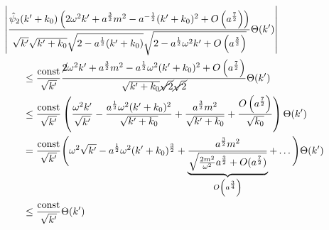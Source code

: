 \begin{align}
&\kern -2em
    \left|
    \frac{
        \hat\psi_2(k'+k_0) \left(
        2 \omega^2 k' + a^{\frac{3}{2}}m^2-a^{-\frac{1}{2}}(k'+k_0)^2
            + O \left(a^{\frac{7}{2}}\right)
        \right)
    }
    {
        \sqrt{k'} \sqrt{k'+k_0} \sqrt{2-a^{\frac{1}{2}}(k'+k_0)}
        \sqrt{2-a^{\frac{1}{2}}\omega^2 k' + O\left(a^{\frac{3}{2}}\right)}
    }
    \Theta(k')
    \right|
    \nonumber \\ &\leq
    \frac{\textrm{const}}{\sqrt{k'}}
    \frac{
        \cancel{2}\omega^2 k' + a^{\frac{3}{2}}m^2
        -a^{\frac{1}{2}} \omega^2 (k'+k_0)^2 + O\left(a^{\frac{7}{2}}\right)
    }
    {
        \sqrt{k' + k_0}\cancel{\sqrt{2}} \cancel{\sqrt{2}}
    }\Theta(k')
    \nonumber \\ &\leq
    \frac{\textrm{const}}{\sqrt{k'}}
    \left(
        \frac{\omega^2 k'}{\sqrt{k'}}
        - \frac{a^{\frac{1}{2}}\omega^2(k'+k_0)^2}{\sqrt{k'+k_0}}
        + \frac{a^{\frac{3}{2}}m^2}{\sqrt{k'+k_0}}
        + \frac{O\left(a^{\frac{7}{2}}\right)}{\sqrt{k_0}}
    \right)\Theta(k')
    \nonumber \\ &=
    \frac{\textrm{const}}{\sqrt{k'}}
    \Bigg(
        \omega^2 \sqrt{k'} - a^{\frac{1}{2}}\omega^2 (k'+k_0)^{\frac{3}{2}}
        + \underbrace{\frac{a^{\frac{3}{2}}m^2}
                    {\sqrt{\frac{2m^2}{\omega^2}a^{\frac{3}{2}}+O(a^{\frac{7}{2}})}}}_{O\left(a^{\frac{3}{4}}\right)}
        + \dots
    \Bigg)\Theta(k')
    \nonumber \\&\leq
    \frac{\textrm{const}}{\sqrt{k'}}\Theta(k')
    \label{eq:lange_1/sqrt_abschaetzerei}
\end{align}

